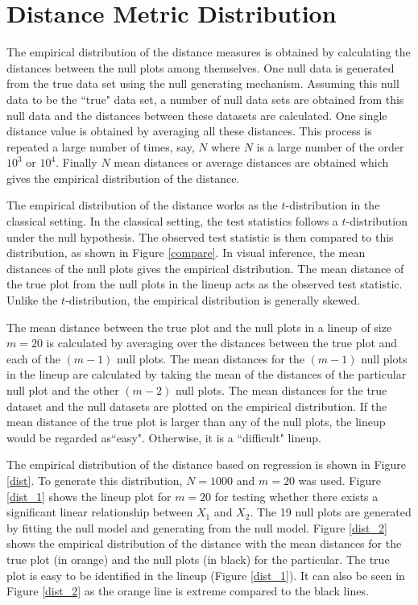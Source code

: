 \documentclass[12]{article}
\begin{document}
\section{Distance Metric Distribution} \label{sec:distri}

The empirical distribution of the distance measures is obtained by calculating the distances between the null plots among themselves. One null data is generated from the true data set using the null generating mechanism. Assuming this null data to be the ``true" data set, a number of null data sets are obtained from this null data and the distances between these datasets are calculated. One single distance value is obtained by averaging all these distances. This process is repeated a large number of times, say, $N$ where $N$ is a large number of the order $10^3$ or $10^4$. Finally $N$ mean distances or average distances are obtained which gives the empirical distribution of the distance. 

The empirical distribution of the distance works as the $t$-distribution in the classical setting. In the classical setting, the test statistics follows a $t$-distribution under the null hypothesis. The observed test statistic is then compared to this distribution, as shown in Figure \ref{compare}. In visual inference, the mean distances of the null plots gives the empirical distribution. The mean distance of the true plot from the null plots in the lineup acts as the observed test statistic. Unlike the $t$-distribution, the empirical distribution is generally skewed.

The mean distance between the true plot and the null plots in a lineup of size $m = 20$ is calculated by averaging over the distances between the true plot and each of the  $(m - 1)$ null plots. The mean distances for the $(m - 1)$ null plots in the lineup are calculated by taking the mean of the distances of the particular null plot and the other $(m - 2)$ null plots. The mean distances for the true dataset and the null datasets are plotted on the empirical distribution. If the mean distance of the true plot is larger than any of the null plots, the lineup would be regarded as``easy". Otherwise, it is a ``difficult" lineup. 

The empirical distribution of the distance based on regression is shown in Figure \ref{dist}. To generate this distribution, $N = 1000$ and $m = 20$ was used. Figure \ref{dist_1} shows the lineup plot for $m = 20$ for testing whether there exists a significant linear relationship between $X_1$ and $X_2$. The 19 null plots are generated by fitting the null model and generating from the null model. Figure \ref{dist_2} shows the empirical distribution of the distance with the mean distances for the true plot (in orange) and the null plots (in black) for the particular. The true plot is easy to be identified in the lineup (Figure \ref{dist_1}). It can also be seen in Figure \ref{dist_2} as the orange line is extreme compared to the black lines. 
\end{document}

